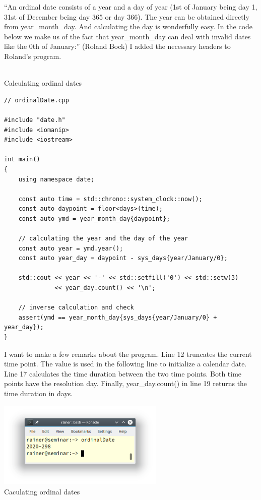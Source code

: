 “An ordinal date consists of a year and a day of year (1st of January being day 1, 31st of December being day 365 or day 366). The year can be obtained directly from year\_month\_day. And calculating the day is wonderfully easy. In the code below we make us of the fact that year\_month\_day can deal with invalid dates like the 0th of January:” (Roland Bock) I added the necessary headers to Roland’s program.

\hspace*{\fill} \\ %
\noindent
Calculating ordinal dates
\begin{lstlisting}[style=styleCXX]
// ordinalDate.cpp

#include "date.h"
#include <iomanip>
#include <iostream>

int main()
{
	using namespace date;
	
	const auto time = std::chrono::system_clock::now();
	const auto daypoint = floor<days>(time);
	const auto ymd = year_month_day{daypoint};
	
	// calculating the year and the day of the year
	const auto year = ymd.year();
	const auto year_day = daypoint - sys_days{year/January/0};
	
	std::cout << year << '-' << std::setfill('0') << std::setw(3)
	          << year_day.count() << '\n';
	
	// inverse calculation and check
	assert(ymd == year_month_day{sys_days{year/January/0} + year_day});
}
\end{lstlisting}

I want to make a few remarks about the program. Line 12 truncates the current time point. The value is used in the following line to initialize a calendar date. Line 17 calculates the time duration between the two time points. Both time points have the resolution day. Finally, year\_day.count() in line 19 returns the time duration in days.

\begin{center}
\includegraphics[width=0.6\textwidth]{content/3/chapter5/images/26.png}\\
Caculating ordinal dates
\end{center}

